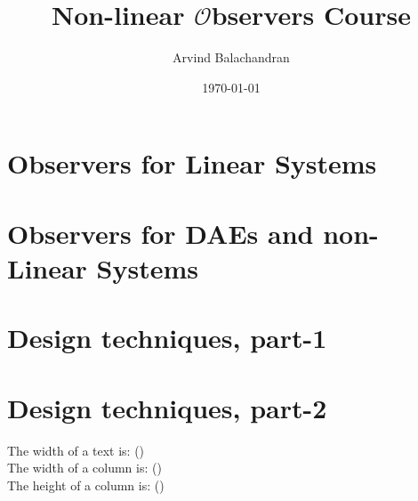 \documentclass[a4paper]{book}
\title{\Large Non-linear $\mathcal{O}$bservers Course}
\author{Arvind Balachandran}
\date{\today}
\begin{document}
\maketitle
{}
\newpage
{}

\chapter{Observers for Linear Systems}

\clearpage
 
\clearpage

\clearpage

\clearpage

\clearpage

\clearpage




\clearpage



\clearpage

\clearpage


\clearpage

\clearpage

\chapter{Observers for DAEs and non-Linear Systems}

\clearpage 

\clearpage

\clearpage

\clearpage

\clearpage

\clearpage

\clearpage


\chapter{Design techniques, part-1}


\chapter{Design techniques, part-2}

\clearpage

\clearpage



\newpage
The width of a text is:
\prntlen{\textwidth} (\prntlen{\textwidth}) \\
The width of a column is:
\prntlen{\columnwidth} (\prntlen{\columnwidth}) \\
The height of a column is:
\prntlen{\textheight} (\prntlen{\textheight}) \\ 
\end{document}
